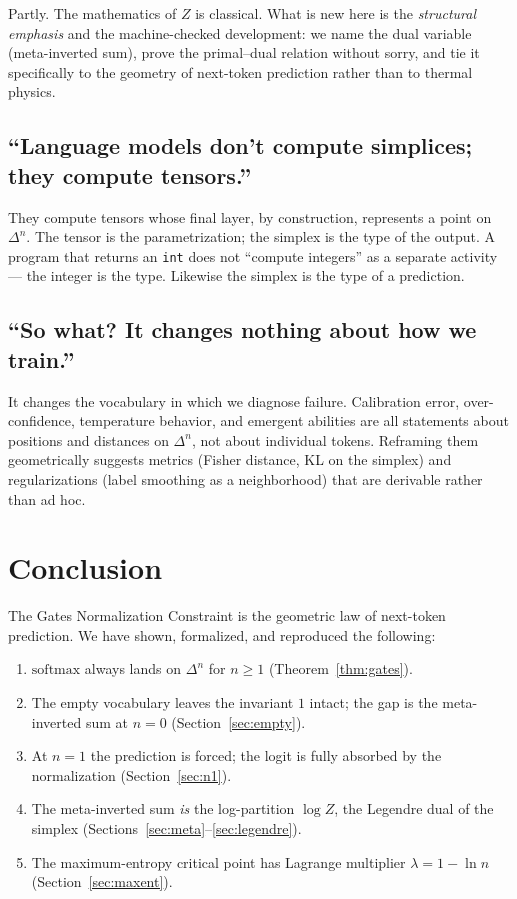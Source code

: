 \documentclass[11pt]{article}
\newcommand{\simplex}[1]{\Delta^{#1}}
\newcommand{\softmax}{\mathrm{softmax}}
\begin{document}
Partly. The mathematics of $Z$ is classical. What is new here is the
\emph{structural emphasis} and the machine-checked development: we name the
dual variable (meta-inverted sum), prove the primal--dual relation without
sorry, and tie it specifically to the geometry of next-token prediction rather
than to thermal physics.

\subsection{``Language models don't compute simplices; they compute tensors.''}
\label{sec:sk-4}

They compute tensors whose final layer, by construction, represents a point on
$\simplex{n}$. The tensor is the parametrization; the simplex is the type of the
output. A program that returns an \texttt{int} does not ``compute integers'' as
a separate activity --- the integer is the type. Likewise the simplex is the
type of a prediction.

\subsection{``So what? It changes nothing about how we train.''}
\label{sec:sk-5}

It changes the vocabulary in which we diagnose failure. Calibration error,
over-confidence, temperature behavior, and emergent abilities are all
statements about positions and distances on $\simplex{n}$, not about individual
tokens. Reframing them geometrically suggests metrics (Fisher distance, KL on
the simplex) and regularizations (label smoothing as a neighborhood) that are
derivable rather than ad hoc.

\section{Conclusion}
\label{sec:conclusion}

The Gates Normalization Constraint is the geometric law of next-token
prediction. We have shown, formalized, and reproduced the following:

\begin{enumerate}
\item $\softmax$ always lands on $\simplex{n}$ for $n\ge 1$ (Theorem~\ref{thm:gates}).
\item The empty vocabulary leaves the invariant $1$ intact; the gap is the
meta-inverted sum at $n=0$ (Section~\ref{sec:empty}).
\item At $n=1$ the prediction is forced; the logit is fully absorbed by the
normalization (Section~\ref{sec:n1}).
\item The meta-inverted sum \emph{is} the log-partition $\log Z$, the Legendre
dual of the simplex (Sections~\ref{sec:meta}--\ref{sec:legendre}).
\item The maximum-entropy critical point has Lagrange multiplier
$\lambda = 1 - \ln n$ (Section~\ref{sec:maxent}).
\end{enumerate}
\end{document}

